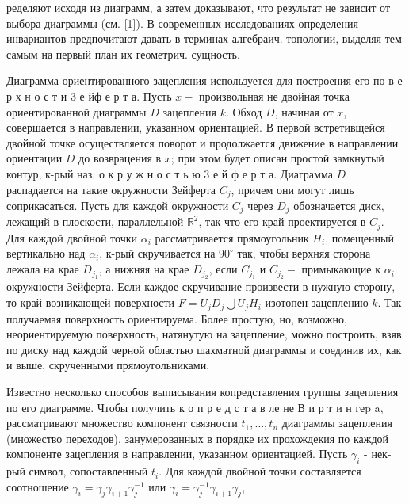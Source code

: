 \documentclass[10pt]{article}
\begin{document}
ределяют исходя из диаграмм, а затем доказывают, что результат не зависит от выбора диаграммы (см. [1]). В современных исследованиях определения инвариантов предпочитают давать в терминах алгебраич. топологии, выделяя тем самым на первый план их геометрич. сущность.



Диаграмма ориентированного зацепления используется для построения его по в е р х н о с т и 3 е йф е р т а. Пусть $x-$ произвольная не двойная точка ориентированной диаграммы $D$ зацепления $k$. Обход $D$, начиная от $x$, совершается в направлении, указанном ориентацией. В первой встретивщейся двойной точке осуществляется поворот и продолжается движение в направлении ориентации $D$ до возврацения в $x$; при этом будет описан простой замкнутый контур, к-рый наз. о к р у ж н о с т ь ю 3 е й ф е р т а. Диаграмма $D$ распадается на такие окружности Зейферта $C_{j}$, причем они могут лишь соприкасаться. Пусть для каждой окружности $C_{j}$ через $D_{j}$ обозначается диск, лежащий в плоскости, параллельной $\mathbb{R}^{2}$, так что его край проектируется в $C_{j}$. Для каждой двойной точки $\alpha_{i}$ рассматривается прямоугольник $H_{i}$, помещенный вертикально над $\alpha_{i}$, к-рый скручивается на $90^{\circ}$ так, чтобы верхняя сторона лежала на крае $D_{j_{1}}$, а нижняя на крае $D_{j_{2}}$, если $C_{j_{1}}$ и $C_{j_{2}}-$ примыкающие к $\alpha_{i}$ окружности Зейферта. Если каждое скручивание произвести в нужную сторону, то край возникающей поверхности $F=U_{j} D_{j} \bigcup U_{j} H_{i}$ изотопен зацеплению $k$. Так получаемая поверхность ориентируема. Более простую, но, возможно, неориентируемую поверхность, натянутую на зацепление, можно построить, взяв по диску над каждой черной областью шахматной диаграммы и соединив их, как и выше, скрученными прямоугольниками.



Известно несколько способов выписывания копредставления групшы зацепления по его диаграмме. Чтобы получить к о п р е д с т а в ле не В и р т и н геp a, рассматривают множество компонент связности $t_{1}, \ldots, t_{n}$ диаграммы зацепления (множество переходов), занумерованных в порядке их прохождекия по каждой компоненте зацепления в направлении, указанном ориентацией. Пусть $\gamma_{i}$ - нек-рый символ, сопоставленный $t_{i}$. Для каждой двойной точки составляется соотношение $\gamma_{i}=\gamma_{j} \gamma_{i+1} \gamma_{j}^{-1}$ или $\gamma_{i}=\gamma_{j}^{-1} \gamma_{i+1} \gamma_{j}$,
\end{document}
